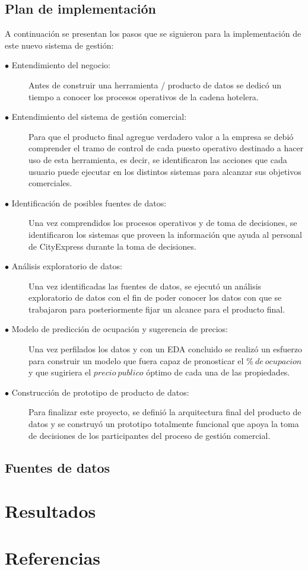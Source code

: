 \documentclass[a4paper,11pt]{article}
\begin{document}
\subsection{Plan de implementación}
A continuación se presentan los pasos que se siguieron para la implementación de este nuevo sistema de gestión:
\begin{description}
\item [$\bullet$ Entendimiento del negocio:]  Antes de construir una herramienta / producto de datos se dedicó un tiempo a conocer los procesos operativos de la cadena hotelera.
\item [$\bullet$ Entendimiento del sistema de gestión comercial:] Para que el producto final agregue verdadero valor a la empresa se debió comprender el tramo de control de cada puesto operativo destinado a hacer uso de esta herramienta, es decir, se identificaron las acciones que cada usuario puede ejecutar en los distintos sistemas para alcanzar sus objetivos comerciales.
\item [$\bullet$ Identificación de posibles fuentes de datos:] Una vez comprendidos los procesos operativos y de toma de decisiones, se identificaron los sistemas que proveen la información que ayuda al personal de CityExpress durante la toma de decisiones.
\item [$\bullet$ Análisis exploratorio de datos:] Una vez identificadas las fuentes de datos, se ejecutó un análisis exploratorio de datos con el fin de poder conocer los datos con que se trabajaron para posteriormente fijar un alcance para el producto final.
\item [$\bullet$ Modelo de predicción de ocupación y sugerencia de precios:] Una vez perfilados los datos y con un EDA concluido se realizó un esfuerzo para construir un modelo que fuera capaz de pronosticar el $\%\ de\ ocupacion$ y que sugiriera el $precio\ publico$ óptimo de cada una de las propiedades.
\item [$\bullet$ Construcción de prototipo de producto de datos:] Para finalizar este proyecto, se definió la arquitectura final del producto de datos y se construyó un prototipo totalmente funcional que apoya la toma de decisiones de los participantes del proceso de gestión comercial.
\end{description}
\subsection{Fuentes de datos}
\section{Resultados}
\section{Referencias}
\end{document}
